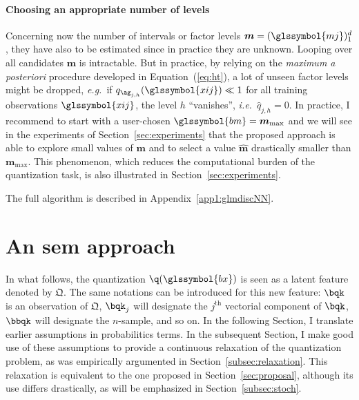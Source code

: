 
 
\paragraph{Choosing an appropriate number of levels}

Concerning now the number of intervals or factor levels $\boldsymbol{m} = (\glssymbol{mj})_1^d$, they have also to be estimated since in practice they are unknown. Looping over all candidates $\boldsymbol{m}$ is intractable. But in practice, by relying on the \textit{maximum a posteriori} procedure developed in Equation~(\ref{eq:ht}), a lot of unseen factor levels might be dropped, \textit{e.g.}\ if $q_{\ag_{j,h}}(\glssymbol{xij}) \ll 1$ for all training observations $\glssymbol{xij}$, the level $h$ ``vanishes'', \textit{i.e.}\ $\hat{q}_{j,h} = 0$. In practice, I recommend to start with a user-chosen $\glssymbol{bm}=\boldsymbol{m}_{\max}$ and we will see in the experiments of Section~\ref{sec:experiments} that the proposed approach is able to explore small values of $\boldsymbol{m}$ and to select a value $\hat{\boldsymbol{m}}$ drastically smaller than $\boldsymbol{m}_{\max}$. This phenomenon, which reduces the computational burden of the quantization task, is also illustrated in Section~\ref{sec:experiments}.

The full algorithm is described in Appendix~\ref{app1:glmdiscNN}.


\section{An \gls{sem} approach} \label{sec:sem}
 
 
In what follows, the quantization $\q(\glssymbol{bx})$ is seen as a latent feature denoted by $\bm{\mathfrak{Q}}$. The same notations can be introduced for this new feature:  $\bqk$ is an observation of $\bm{\mathfrak{Q}}$, $\bqk_j$ will designate the $j^{\text{th}}$ vectorial component of $\bqk$, $\bbqk$ will designate the $n$-sample, and so on. In the following Section, I translate earlier assumptions in probabilitics terms. In the subsequent Section, I make good use of these assumptions to provide a continuous relaxation of the quantization problem, as was empirically argumented in Section~\ref{subsec:relaxation}. This relaxation is equivalent to the one proposed in Section~\ref{sec:proposal}, although its use differs drastically, as will be emphasized in Section~\ref{subsec:stoch}.

